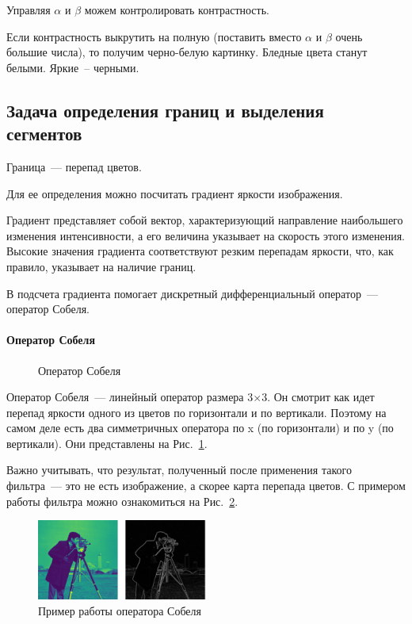 Управляя $\alpha$ и $\beta$ можем контролировать контрастность.

Если контрастность выкрутить на полную (поставить вместо $\alpha$ и $\beta$ очень большие числа), то получим черно-белую картинку.
Бледные цвета станут белыми. Яркие~-- черными.

\subsection{Задача определения границ и выделения сегментов}

Граница~--- перепад цветов.

Для ее определения можно посчитать градиент яркости изображения.

Градиент представляет собой вектор, характеризующий направление наибольшего изменения интенсивности, а его величина указывает на скорость этого изменения. Высокие значения градиента соответствуют резким перепадам яркости, что, как правило, указывает на наличие границ.

В подсчета градиента помогает дискретный дифференциальный оператор~--- оператор Собеля.
\paragraph{Оператор Собеля}

\begin{figure}[h]
    \centering
    
    \caption{Оператор Собеля}
    \label{fig:sobel}
\end{figure}

Оператор Собеля~--- линейный оператор размера 3$\times$3. Он смотрит как идет перепад яркости одного из цветов по горизонтали и по вертикали. Поэтому на самом деле есть два симметричных оператора по x (по горизонтали) и по y (по вертикали). Они представлены на Рис.~\ref{fig:sobel}.

Важно учитывать, что результат, полученный после применения такого фильтра~--- это не есть изображение, а скорее карта перепада цветов. С примером работы фильтра можно ознакомиться на Рис.~\ref{fig:sobel_example}.

\begin{figure}[h]
    \centering
    \includegraphics[width=0.5\textwidth]{sobel_example.png}
    \caption{Пример работы оператора Собеля}
    \label{fig:sobel_example}
\end{figure}

